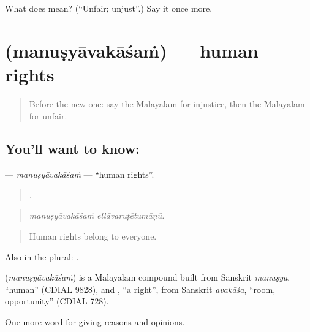 \begin{tcolorbox}[breakable,colback=teal!4,colframe=teal!35!black,title={Before you move on}]
What does  mean? (\textquotedblleft{}Unfair; unjust\textquotedblright{}.) Say it once more.
\end{tcolorbox}
\section[\texorpdfstring{\ml{മനുഷ്യാവകാശം} (manuṣyāvakāśaṁ)}{മനുഷ്യാവകാശം (manuṣyāvakāśaṁ)}]{ (manuṣyāvakāśaṁ) — human rights}

\label{lesson:ML-C416-manusyavakasam}



\begin{quote}
Before the new one: say the Malayalam for injustice, then the Malayalam for unfair.
\end{quote}

\subsection*{You'll want to know: }
\textbf{} — \emph{manuṣyāvakāśaṁ} — \textquotedblleft{}human rights\textquotedblright{}.

\begin{quote}
 .
\end{quote}

\begin{quote}
\emph{manuṣyāvakāśaṁ ellāvaruṭētumāṇŭ.}
\end{quote}

\begin{quote}
Human rights belong to everyone.
\end{quote}

Also in the plural: .

\begin{cousinweb}
\textbf{} (\emph{manuṣyāvakāśaṁ}) is a Malayalam compound built from Sanskrit \emph{manuṣya}, \textquotedblleft{}human\textquotedblright{} (CDIAL 9828), and , \textquotedblleft{}a right\textquotedblright{}, from Sanskrit \emph{avakāśa}, \textquotedblleft{}room, opportunity\textquotedblright{} (CDIAL 728).
\end{cousinweb}

\begin{grammarlens}[title={What you've built}]
One more word for giving reasons and opinions.
\end{grammarlens}

